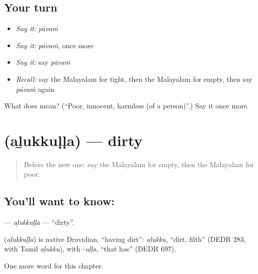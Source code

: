 \subsection*{Your turn}
\begin{itemize}
\raggedright
  \item \emph{Say it:} \emph{pāvaṁ}
  \item \emph{Say it:} \emph{pāvaṁ}, once more
  \item \emph{Say it:} say \emph{pāvaṁ}
  \item \emph{Recall:} say the Malayalam for tight, then the Malayalam for empty, then say \emph{pāvaṁ} again
\end{itemize}

\begin{tcolorbox}[breakable,colback=teal!4,colframe=teal!35!black,title={Before you move on}]
What does  mean? (\textquotedblleft{}Poor, innocent, harmless (of a person)\textquotedblright{}.) Say it once more.
\end{tcolorbox}
\section[\texorpdfstring{\ml{അഴുക്കുള്ള} (aḻukkuḷḷa)}{അഴുക്കുള്ള (aḻukkuḷḷa)}]{ (aḻukkuḷḷa) — dirty}

\label{lesson:ML-C204-alukkulla}



\begin{quote}
Before the new one: say the Malayalam for empty, then the Malayalam for poor.
\end{quote}

\subsection*{You'll want to know: }
\textbf{} — \emph{aḻukkuḷḷa} — \textquotedblleft{}dirty\textquotedblright{}.

\begin{cousinweb}
\textbf{} (\emph{aḻukkuḷḷa}) is native Dravidian, \textquotedblleft{}having dirt\textquotedblright{}: \emph{aḻukku}, \textquotedblleft{}dirt, filth\textquotedblright{} (DEDR 283, with Tamil \emph{aḻukku}), with \emph{-uḷḷa}, \textquotedblleft{}that has\textquotedblright{} (DEDR 697).
\end{cousinweb}

\begin{grammarlens}[title={What you've built}]
One more word for this chapter.
\end{grammarlens}


